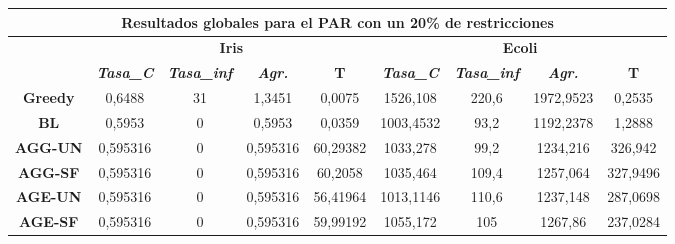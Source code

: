 \documentclass[12pt, spanish]{article}
\begin{document}
\begin{table}[H]
\footnotesize
\begin{tabular}{|c|c|c|c|c|c|c|c|c|}
\hline
\multicolumn{9}{|c|}{\textbf{Resultados globales para el PAR con un 20\% de restricciones}}                                                                                                                           \\ \hline
\multirow{2}{*}{}     & \multicolumn{4}{c|}{\textbf{Iris}}                                                            & \multicolumn{4}{c|}{\textbf{Ecoli}}                                                           \\ \cline{2-9} 
                      & \textit{\textbf{Tasa\_C}} & \textit{\textbf{Tasa\_inf}} & \textit{\textbf{Agr.}} & \textbf{T} & \textit{\textbf{Tasa\_C}} & \textit{\textbf{Tasa\_inf}} & \textit{\textbf{Agr.}} & \textbf{T} \\ \hline
\textbf{Greedy}       & 0,6488                    & 31                          & 1,3451                 & 0,0075     & 1526,108                  & 220,6                       & 1972,9523              & 0,2535     \\ \hline
\textbf{BL}           & 0,5953                    & 0                           & 0,5953                 & 0,0359     & 1003,4532                 & 93,2                        & 1192,2378              & 1,2888     \\ \hline
\textbf{AGG-UN}       & 0,595316                  & 0                           & 0,595316               & 60,29382   & 1033,278                  & 99,2                        & 1234,216               & 326,942    \\ \hline
\textbf{AGG-SF}       & 0,595316                  & 0                           & 0,595316               & 60,2058    & 1035,464                  & 109,4                       & 1257,064               & 327,9496   \\ \hline
\textbf{AGE-UN}       & 0,595316                  & 0                           & 0,595316               & 56,41964   & 1013,1146                 & 110,6                       & 1237,148               & 287,0698   \\ \hline
\textbf{AGE-SF}       & 0,595316                  & 0                           & 0,595316               & 59,99192   & 1055,172                  & 105                         & 1267,86                & 237,0284   \\ \hline

\end{tabular}
\end{table}
\end{document}
